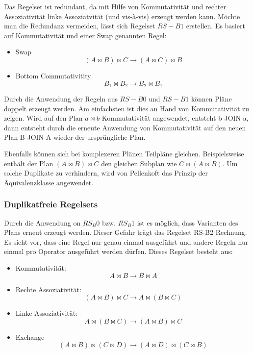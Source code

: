 Das Regelset ist redundant, da mit Hilfe von Kommutativität und rechter Assoziativität linke Assoziatvität (und vis-à-vis) erzeugt werden kann. Möchte man die Redundanz vermeiden, lässt sich Regelset $RS-B1$ erstellen. Es basiert auf Kommutativität und einer Swap genannten Regel:

\begin{itemize}
\item Swap $$ (A \Join B) \Join C \to (A \Join C) \Join B $$
\item Bottom Commutativitity $$ B_1 \Join B_2 \to B_2 \Join B_1$$
\end{itemize}


Durch die Anwendung der Regeln aus $RS-B0$ und $RS-B1$ können Pläne doppelt erzeugt werden. Am einfachsten ist dies an Hand von Kommutativität zu zeigen. Wird auf den Plan $a \Join b$ Kommutativität angewendet, entsteht b JOIN a, dann entsteht durch  die erneute Anwendung von Kommutativität auf den neuen Plan B JOIN A wieder der ursprüngliche Plan.

Ebenfalls können sich bei komplexeren Plänen     Teilpläne gleichen. Beispielsweise enthält der Plan $(A \Join B) \Join C$ den gleichen Subplan wie $C \Join (A \Join B)$. Um solche Duplikate zu verhindern, wird von Pellenkoft das Prinzip der Äquivalenzklasse angewendet.



\subsubsection{Duplikatfreie Regelsets}
Durch die Anwendung on $RS_B0$ bzw. $RS_B1$ ist es möglich, dass Varianten des Plans erneut erzeugt werden. Dieser Gefahr trägt das Regelset RS-B2 Rechnung. Es sieht vor, dass eine Regel nur genau einmal ausgeführt und andere Regeln nur einmal pro Operator ausgeführt werden dürfen. Dieses Regelset besteht aus:


\begin{itemize}
\item Kommutativität: $$ A \Join B \to B \Join A$$
\item Rechte Assoziativität: $$(A \Join B) \Join C \to A \Join (B \Join C) $$
\item Linke Assoziativität: $$A \Join (B \Join C) \to (A \Join B) \Join C$$

\item Exchange $$(A \Join B) \Join (C \Join D) \to (A \Join D) \Join (C \Join B) $$
\end{itemize}



